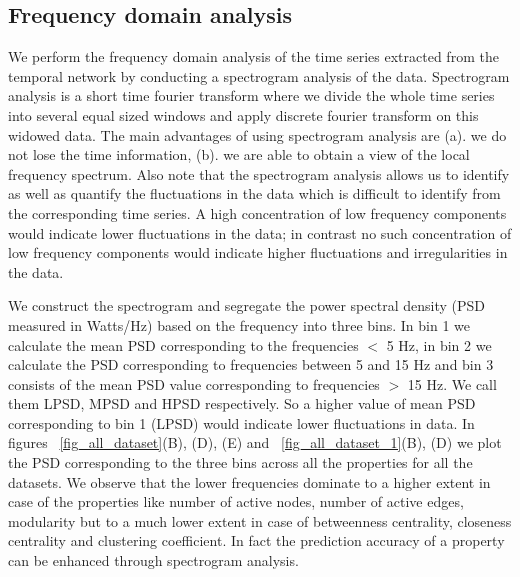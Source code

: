 \noindent
\subsection{Frequency domain analysis}
\label{spectrogram}
 


We perform the frequency domain analysis of 
the time series extracted from the temporal network
by conducting
  a spectrogram analysis of the data. Spectrogram analysis is a short time fourier transform 
where we divide the whole time series into several equal sized windows and apply discrete fourier transform on this widowed data.
The main advantages of using spectrogram analysis are
 (a). we do not lose the time information,
 (b). we are able to obtain a view of the local frequency spectrum.
Also note that the spectrogram analysis allows us to identify as well as quantify the fluctuations in the data which is difficult to identify 
from the corresponding time series. 
A high concentration of low frequency components would indicate lower fluctuations in the data; in contrast no such concentration of low frequency components 
would indicate higher fluctuations and irregularities in the data.

We construct the spectrogram and segregate the power spectral density (PSD measured in Watts/Hz) based on the frequency into three bins. In bin 1 we calculate the mean PSD 
corresponding to the frequencies $<$ 5 Hz, in bin 2 we calculate the PSD corresponding to frequencies between 5 and 15 Hz and bin 3 consists of the 
mean PSD value corresponding to frequencies $>$ 15 Hz. We call them LPSD, MPSD and HPSD respectively.
So a higher value of mean PSD corresponding to bin 1 (LPSD) would indicate lower fluctuations in data. 
In figures ~\ref{fig_all_dataset}(B), (D), (E) and ~\ref{fig_all_dataset_1}(B), (D) we plot the PSD corresponding to the three bins across all the properties for all the datasets. We 
observe that the lower frequencies dominate to a higher extent in case of the properties like number of active nodes, number of active edges, modularity 
but to a much lower extent in case of betweenness centrality, closeness centrality and clustering coefficient.  
In fact the prediction accuracy of a property can be enhanced through spectrogram analysis.



